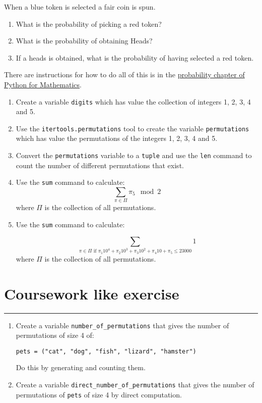 \documentclass{article}
\begin{document}
When a blue token is selected a fair coin is spun.

\begin{enumerate}
    \item What is the probability of picking a red token?
    \item What is the probability of obtaining Heads?
    \item If a heads is obtained, what is the probability of having selected a red token.
\end{enumerate}

There are instructions for how to do all of this is in the
\href{https://vknight.org/pfm/tools-for-mathematics/06-probability/how/main.html}{probability chapter of Python for Mathematics}.


\begin{enumerate}
    \item Create a variable \texttt{digits} which has value the
        collection of integers 1, 2, 3, 4 and 5.
\item
    Use the \texttt{itertools.permutations} tool to create the
        variable \texttt{permutations} which has value the
        permutations of the integers 1, 2, 3, 4 and 5. 
    \item Convert the \texttt{permutations} variable to a
        \texttt{tuple} and use the \texttt{len} command
        to count the number of different permutations that exist.
    \item Use the \texttt{sum} command to calculate:
        \[\sum_{\pi \in \Pi}\pi_5\mod 2\] where $\Pi$ is the collection of all
        permutations. 
    \item Use the \texttt{sum} command to calculate:

        \[\sum_{\pi \in \Pi \text{ if }\pi_1 10 ^ 4 + \pi_2 10 ^ 3 + \pi_3 10 ^ 2 + \pi_4 10 + \pi_5 \leq 23000} 1 \] 
        where $\Pi$ is the collection of all
        permutations. 
\end{enumerate}


\section{Coursework like exercise}
\hrule


\begin{enumerate}
    \item Create a variable \texttt{number_of_permutations} that gives the 
number of permutations of size 4 of:

\texttt{pets = ("cat", "dog", "fish", "lizard", "hamster")}

Do this by generating and counting them.
\item Create a variable \texttt{direct_number_of_permutations} that gives 
    the number of permutations of \texttt{pets} of size 4 by 
        direct computation.
\end{enumerate}
\end{document}
